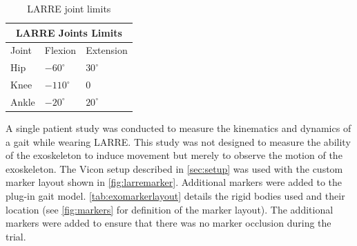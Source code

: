 \begin{table}[h!]
\begin{centering}
    \begin{tabular}{ |p{1cm} p{2cm} p{2cm} |  }
        \hline 
        \multicolumn{3}{|c|}{LARRE Joints Limits} \\
        \hline 
        Joint & Flexion & Extension \\
        \hline \hline
        Hip   & $-60^{\circ}$   & $30^{\circ}$  \\
        Knee &   $-110^{\circ}$  & $0$   \\
        Ankle & $-20^{\circ}$ & $20^{\circ}$  \\
        \hline
    \end{tabular}
    \caption[LARRE Joint Limits]{LARRE joint limits}    \centering
    \label{tab:jointlimits}
\end{centering}
\end{table}


A single patient study was conducted to measure the kinematics and dynamics of a gait while wearing LARRE. This study was not designed to measure the ability of the exoskeleton to induce movement but merely to observe the motion of the exoskeleton. The Vicon setup described in \autoref{sec:setup} was used with the custom marker layout shown in \autoref{fig:larremarker}. Additional markers were added to the plug-in gait model. \autoref{tab:exomarkerlayout} details the rigid bodies used and their location (see \autoref{fig:markers} for definition of the marker layout). The additional markers were added to ensure that there was no marker occlusion during the trial. 


